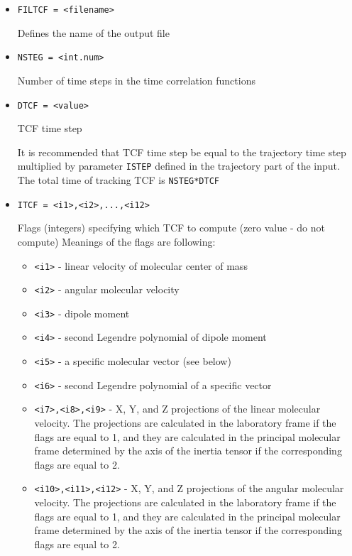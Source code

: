 \documentclass{article}
\begin{document}
\begin{itemize}

\item
\verb|FILTCF = <filename>|

Defines the name of the output file

\item
\verb|NSTEG = <int.num>|

Number of time steps in the time correlation functions

\item
\verb|DTCF = <value>|

TCF time step

It is recommended that TCF time step be equal to the trajectory time
step multiplied by parameter \verb|ISTEP| defined in the trajectory part 
of the input. The total time of tracking TCF is \verb|NSTEG*DTCF|

\item
\verb|ITCF = <i1>,<i2>,...,<i12>|

Flags (integers) specifying which TCF to compute (zero value - do not compute)
Meanings of the flags are following:

\begin{itemize}

\item
\verb|<i1>| - linear velocity of molecular center of mass

\item
\verb|<i2>| - angular molecular velocity 

\item
\verb|<i3>| - dipole moment

\item
\verb|<i4>| - second Legendre polynomial of dipole moment

\item
\verb|<i5>| - a specific molecular vector (see below)

\item
\verb|<i6>| - second Legendre polynomial of a specific vector

\item
\verb|<i7>,<i8>,<i9>| - X, Y, and Z projections of the linear molecular
velocity. The projections are calculated in the laboratory frame if 
the flags are equal to 1, and they are calculated in the principal
molecular frame determined by the axis of the inertia tensor if the
corresponding flags are equal to 2.

\item
\verb|<i10>,<i11>,<i12>| - X, Y, and Z projections of the angular molecular
velocity. The projections are calculated in the laboratory frame if 
the flags are equal to 1, and they are calculated in the principal
molecular frame determined by the axis of the inertia tensor if the
corresponding flags are equal to 2.


\end{itemize}
\end{itemize}
\end{document}
